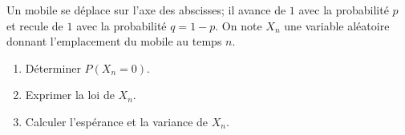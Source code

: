 \begin{enonce}
\begin{exercise}[ID={RMS133 E1343},subtitle={IMT MP 2022},tags={},difficulty={}]
Un mobile se déplace sur l'axe des abscisses; il avance de $1$ avec la probabilité $p$ et recule de $1$ avec la probabilité $q=1-p$.
On note $X_n$ une variable aléatoire donnant l'emplacement du mobile au temps $n$.
\begin{enumerate}
  \item Déterminer $P(X_n = 0)$.
  \item Exprimer la loi de $X_n$.
  \item Calculer l'espérance et la variance de $X_n$.
\end{enumerate}
\end{exercise}
\begin{solution}
\end{solution}
\end{enonce}
